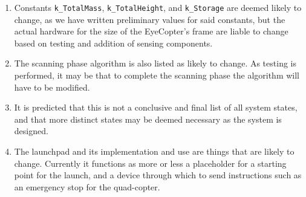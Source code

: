 \documentclass[10pt,letterpaper]{article}
\begin{document}
\begin{enumerate}
	\item Constants \texttt{k\_TotalMass}, \texttt{k\_TotalHeight}, and \texttt{k\_Storage} are deemed likely to change, as we have written preliminary values for said constants, but the actual hardware for the size of the EyeCopter's frame are liable to change based on testing and addition of sensing components.
    \item The scanning phase algorithm is also listed as likely to change. As testing is performed, it may be that to complete the scanning phase the algorithm will have to be modified.
    \item It is predicted that this is not a conclusive and final list of all system states, and that more distinct states may be deemed necessary as the system is designed.
    \item The launchpad and its implementation and use are things that are likely to change. Currently it functions as more or less a placeholder for a starting point for the launch, and a device through which to send instructions such as an emergency stop for the quad-copter.
\end {enumerate}
\end{document}
